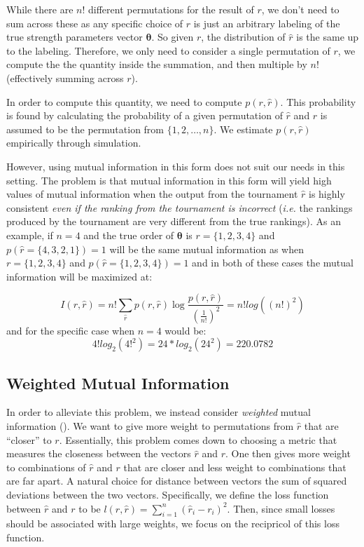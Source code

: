 \documentclass[
  12pt]{article}
\begin{document}
While there are \(n!\) different permutations for the result of \(r\),
we don't need to sum across these as any specific choice of \(r\) is
just an arbitrary labeling of the true strength parameters vector
\(\boldsymbol{\theta}\). So given \(r\), the distribution of \(\hat{r}\)
is the same up to the labeling. Therefore, we only need to consider a
single permutation of \(r\), we compute the the quantity inside the
summation, and then multiple by \(n!\) (effectively summing across
\(r\)).

In order to compute this quantity, we need to compute \(p(r,\hat{r})\).
This probability is found by calculating the probability of a given
permutation of \(\hat{r}\) and \(r\) is assumed to be the permutation
from \(\{1, 2, \ldots, n\}\). We estimate \(p(r,\hat{r})\) empirically
through simulation.

However, using mutual information in this form does not suit our needs
in this setting. The problem is that mutual information in this form
will yield high values of mutual information when the output from the
tournament \(\hat{r}\) is highly consistent \emph{even if the ranking
from the tournament is incorrect} (\emph{i.e.} the rankings produced by
the tournament are very different from the true rankings). As an
example, if \(n=4\) and the true order of \(\boldsymbol{\theta}\) is
\(r = \{1, 2, 3, 4\}\) and \(p(\hat{r} = \{4, 3, 2, 1\}) = 1\) will be
the same mutual information as when \(r = \{1, 2, 3, 4\}\) and
\(p(\hat{r} = \{1, 2, 3, 4\}) = 1\) and in both of these cases the
mutual information will be maximized at:

\[
I(r,\hat{r})= n!\sum_{\hat{r}}p(r,\hat{r})\log \frac {p(r,\hat{r})}{\left(\frac{1}{n!}\right)^2} = n! log((n!)^2)
\] and for the specific case when \(n=4\) would be: \[
4! log_2(4!^2) = 24*log_2(24^2) = 220.0782
\]

\subsection{Weighted Mutual
Information}\label{weighted-mutual-information}

In order to alleviate this problem, we instead consider \emph{weighted}
mutual information (\citet{Guiasu1977-nu}). We want to give more weight
to permutations from \(\hat{r}\) that are ``closer'' to \(r\).
Essentially, this problem comes down to choosing a metric that measures
the closeness between the vectors \(\hat{r}\) and \(r\). One then gives
more weight to combinations of \(\hat{r}\) and \(r\) that are closer and
less weight to combinations that are far apart. A natural choice for
distance between vectors the sum of squared deviations between the two
vectors. Specifically, we define the loss function between \(\hat{r}\)
and \(r\) to be \(l(r, \hat{r}) = \sum_{i=1}^n (\hat{r}_i - r_i)^2\).
Then, since small losses should be associated with large weights, we
focus on the recipricol of this loss function.
\end{document}
